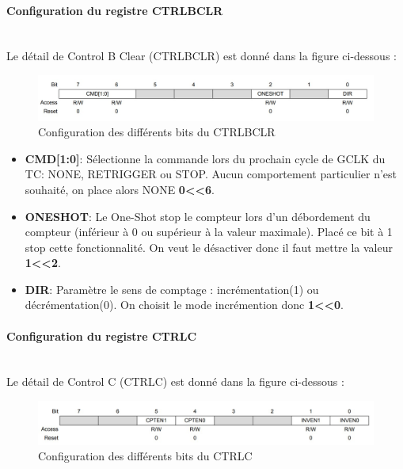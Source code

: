 \documentclass[a4paper]{article}
\begin{document}
	\newpage
	\paragraph{Configuration du registre CTRLBCLR} 
	~~\\
	Le détail de Control B Clear (CTRLBCLR) est donné dans la figure ci-dessous :
	\begin{figure}[H]
		\centering
		\includegraphics[width=0.9\linewidth]{CTRLBCLR.jpg}
		\caption{Configuration des différents bits du CTRLBCLR}
	\end{figure}
	
	\begin{itemize}
		\item {\bf CMD[1:0]}: Sélectionne la commande lors du prochain cycle de GCLK du TC: NONE, RETRIGGER ou STOP. Aucun comportement particulier n’est souhaité, on place alors NONE {\bf 0\textless\textless6}.~~\\
		\item {\bf ONESHOT}: Le One-Shot stop le compteur lors d’un débordement du compteur (inférieur à 0 ou supérieur à la valeur maximale). Placé ce bit à 1 stop cette fonctionnalité. On veut le désactiver donc il faut mettre la valeur {\bf 1\textless\textless2}.~~\\
		\item {\bf DIR}: Paramètre le sens de comptage : incrémentation(1) ou décrémentation(0). On choisit le mode incrémention donc {\bf 1\textless\textless0}.~~\\
	\end{itemize}
	
	\paragraph{Configuration du registre CTRLC} 
	~~\\
	Le détail de Control C (CTRLC) est donné dans la figure ci-dessous :
	\begin{figure}[H]
		\centering
		\includegraphics[width=0.9\linewidth]{CTRLC.jpg}
		\caption{Configuration des différents bits du CTRLC}
	\end{figure}
	
\end{document}
